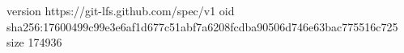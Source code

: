 version https://git-lfs.github.com/spec/v1
oid sha256:17600499c99e3e6af1d677c51abf7a6208fcdba90506d746e63bac775516c725
size 174936
